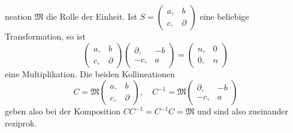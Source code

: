 neation $\mathfrak{M}$ die Rolle der Einheit. Ist $S = \begin{pmatrix} a, & b \\ c, & \partial \end{pmatrix}$ eine beliebige Transformation, so ist
\[
\begin{pmatrix} a, & b \\ c, & \partial \end{pmatrix}\begin{pmatrix} \partial, & -b \\ -c, & a \end{pmatrix} = \begin{pmatrix} n, & 0 \\ 0, & n \end{pmatrix}
\]
eine Multiplikation. Die beiden Kollineationen
\[
C = \mathfrak{M}\begin{pmatrix} a, & b \\ c, & \partial \end{pmatrix}, \quad C^{-1} = \mathfrak{M}\begin{pmatrix} \partial, & -b \\ -c, & a \end{pmatrix}
\]
geben also bei der Komposition $CC^{-1} = C^{-1}C = \mathfrak{M}$ und sind also zueinander reziprok.

\begin{center}
\end{center}

